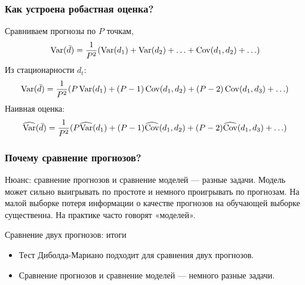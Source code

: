 \begin{frame}
  \frametitle{Как устроена робастная оценка?}
  
  Сравниваем прогнозы по $P$ точкам, 
  \[
  \operatorname{Var}(\bar d) = \frac{1}{P^2} (\operatorname{Var}(d_1) + \operatorname{Var}(d_2) + \ldots + \operatorname{Cov}(d_1, d_2) + \ldots)  
  \]\pause
  Из стационарности $d_t$:
  \[
    \operatorname{Var}(\bar d) = \frac{1}{P^2} (P\operatorname{Var}(d_1) + (P-1) \operatorname{Cov}(d_1, d_2) + (P-2)\operatorname{Cov}(d_1, d_3) +\ldots)  
  \]\pause 
  Наивная оценка:
  \[
    \widehat{\operatorname{Var}}(\bar d) = \frac{1}{P^2} (P\widehat{\operatorname{Var}}(d_1) + (P-1) \widehat{\operatorname{Cov}}(d_1, d_2) + (P-2)\widehat{\operatorname{Cov}}(d_1, d_3) +\ldots)  
  \]
\end{frame}



\begin{frame}
    \frametitle{Почему сравнение прогнозов?}

    \alert{Нюанс}: сравнение прогнозов и сравнение моделей — разные задачи. 
    \pause
    Модель может сильно выигрывать \alert{по простоте} и немного проигрывать по прогнозам.
    \pause 
    На малой выборке \alert{потеря информации} о качестве прогнозов на обучающей выборке существенна. 
    \pause 
    На практике часто \alert{говорят «моделей»}.
\end{frame}


\begin{frame}{Сравнение двух прогнозов: итоги}

  \begin{itemize}[<+->]
    \item Тест Диболда-Мариано подходит для сравнения \alert{двух} прогнозов. 
    \item Сравнение прогнозов и сравнение моделей — \alert{немного разные} задачи.  
  \end{itemize}
\end{frame}


